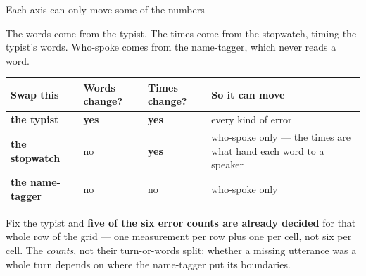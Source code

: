 \documentclass[aspectratio=169]{beamer}
\newcommand{\keybox}[1]{%
  \par\vspace{4pt}\begingroup\centering
  \colorbox{warmbg}{\parbox{0.93\textwidth}{\centering #1}}%
  \par\endgroup\vspace{2pt}}
\newenvironment{nicetable}[1]
  {\par\vspace{2pt}\begingroup\centering\small
   \renewcommand{\arraystretch}{1.18}%
   \setlength{\tabcolsep}{6pt}\rowcolors{2}{band}{white}%
   \begin{tabular}{#1}\arrayrulecolor{hdr}\toprule}
  {\bottomrule\end{tabular}\par\endgroup\vspace{2pt}}
\newcommand{\hd}[1]{\textcolor{hdr}{\textbf{#1}}}
\newcommand{\typist}{\textbf{the typist}}
\newcommand{\timer}{\textbf{the stopwatch}}
\newcommand{\tagger}{\textbf{the name-tagger}}
\begin{document}
\begin{frame}{Each axis can only move some of the numbers}

The words come from the typist. The times come from the stopwatch, timing the typist's
words. Who-spoke comes from the name-tagger, which never reads a word.

\begin{nicetable}{p{2.8cm}p{1.9cm}p{1.9cm}p{4.7cm}}
\hd{Swap this} & \hd{Words change?} & \hd{Times change?} & \hd{So it can move} \\ \midrule
\typist{}   & \textcolor{warm}{\textbf{yes}} & \textcolor{warm}{\textbf{yes}}
            & every kind of error \\
\timer{}    & no & \textcolor{warm}{\textbf{yes}}
            & who-spoke only --- the times are what hand each word to a speaker \\
\tagger{}   & no & no
            & who-spoke only \\
\end{nicetable}

\keybox{Fix the typist and \textbf{five of the six error counts are already decided} for
that whole row of the grid --- one measurement per row plus one per cell, not six per cell.
The \emph{counts}, not their turn-or-words split: whether a missing utterance was a whole
turn depends on where the name-tagger put its boundaries.}

\end{frame}

\end{document}
